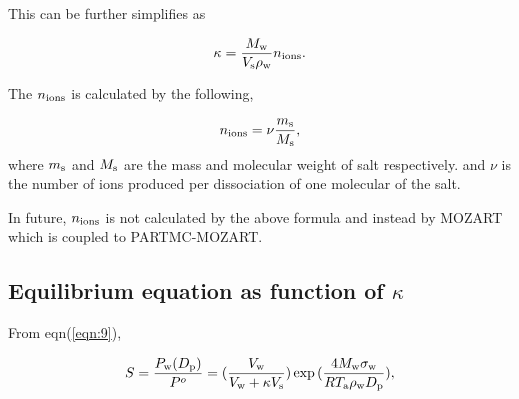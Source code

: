 \documentclass[12pt]{article}
\begin{document}
This can be further simplifies as 

\begin{equation}
\kappa= \frac{M_{\rm w}}{V_{\rm s} \rho_{\rm w}}n_{\rm ions}.
\end{equation}

The $n_{\rm ions}$ is calculated by the following, 

\begin{equation}
n_{\rm ions}=\nu \frac{m_{\rm s}}{M_{\rm s}},
\end{equation}
where $m_{\rm s}$ and $M_{\rm s}$ are the mass and molecular weight of salt respectively. and $\nu$ is the number of ions produced per dissociation of one molecular of the salt.  

In future, $n_{\rm ions}$ is not calculated by the above formula and instead by MOZART which is coupled to PARTMC-MOZART.



\subsection{Equilibrium equation as function of $\kappa$}

From eqn(\ref{eqn:9}),

\begin{equation}\label{eqn:19}
S=\frac{P_{\rm w}(D_{\rm p})}{P^{o}}=(\frac{V_{\rm w}}{V_{\rm w} + \kappa V_{\rm s}})   \exp{(\frac{4 M_{\rm w} \sigma_{\rm w}}{R T_{\rm a} \rho_{\rm w} D_{\rm p}})},
\end{equation}





\end{document}
